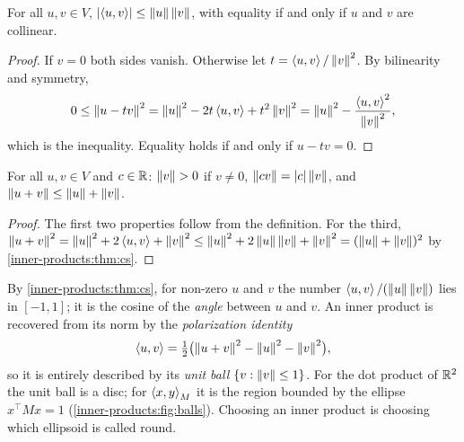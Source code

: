 \begin{notechapter}
\begin{theorem}\label{inner-products:thm:cs}
For all $u, v\in V$, $\left|\left\langle u, v \right\rangle\right|\leq\left\|u\right\|\left\|v\right\|$, with equality if
and only if $u$ and $v$ are collinear.
\end{theorem}

\begin{proof}
If $v = 0$ both sides vanish. Otherwise let $t = \left\langle u, v \right\rangle/\left\|v\right\|^2$.
By bilinearity and symmetry,
\[
  0\leq\left\|u - tv\right\|^2 = \left\|u\right\|^2 - 2t\left\langle u, v \right\rangle + t^2\left\|v\right\|^2
  = \left\|u\right\|^2 - \frac{\left\langle u, v \right\rangle^2}{\left\|v\right\|^2} ,
\]
which is the inequality. Equality holds if and only if $u - tv = 0$.
\end{proof}

\begin{corollary}\label{inner-products:cor:norm}
For all $u, v\in V$ and $c\in\mathbb{R}$: $\left\|v\right\| > 0$ if $v\neq0$,
$\left\|cv\right\| = \left|c\right|\left\|v\right\|$, and $\left\|u + v\right\|\leq\left\|u\right\| + \left\|v\right\|$.
\end{corollary}

\begin{proof}
The first two properties follow from the definition. For the third,
$\left\|u + v\right\|^2 = \left\|u\right\|^2 + 2\left\langle u, v \right\rangle + \left\|v\right\|^2
\leq\left\|u\right\|^2 + 2\left\|u\right\|\left\|v\right\| + \left\|v\right\|^2 = (\left\|u\right\| + \left\|v\right\|)^2$ by
\cref{inner-products:thm:cs}.
\end{proof}

By \cref{inner-products:thm:cs}, for non-zero $u$ and $v$ the number
$\left\langle u, v \right\rangle/(\left\|u\right\|\left\|v\right\|)$ lies in $[-1, 1]$; it is the cosine of the
\emph{angle} between $u$ and $v$. An inner product is recovered from its
norm by the \emph{polarization identity}
\begin{equation}\label{inner-products:eq:polarization}
  \left\langle u, v \right\rangle = \tfrac12\bigl(\left\|u + v\right\|^2 - \left\|u\right\|^2 - \left\|v\right\|^2\bigr) ,
\end{equation}
so it is entirely described by its \emph{unit ball}
$\{v : \left\|v\right\|\leq1\}$. For the dot product of $\mathbb{R}^2$ the unit ball is a
disc; for $\left\langle x, y \right\rangle_M$ it is the region bounded by the ellipse
$x^\top Mx = 1$ (\cref{inner-products:fig:balls}). Choosing an inner product
is choosing which ellipsoid is called round.


\end{notechapter}
